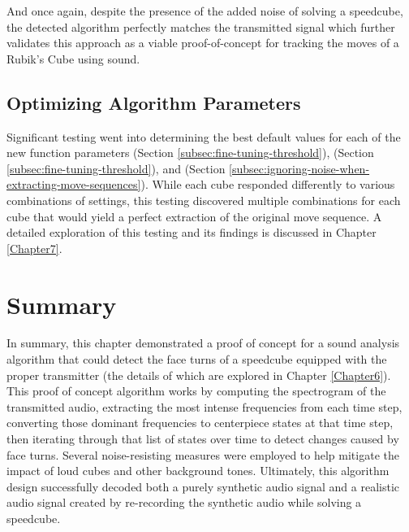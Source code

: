 And once again, despite the presence of the added noise of solving a speedcube, the detected algorithm perfectly matches the transmitted signal which further validates this approach as a viable proof-of-concept for tracking the moves of a Rubik's Cube using sound.

\subsection{Optimizing Algorithm Parameters}
\label{subsec:optimizing-params}
Significant testing went into determining the best default values for each of the new function parameters  (Section \ref{subsec:fine-tuning-threshold}),  (Section \ref{subsec:fine-tuning-threshold}), and  (Section \ref{subsec:ignoring-noise-when-extracting-move-sequences}).
While each cube responded differently to various combinations of settings, this testing discovered multiple combinations for each cube that would yield a perfect extraction of the original move sequence.
A detailed exploration of this testing and its findings is discussed in Chapter \ref{Chapter7}.

\section{Summary}
In summary, this chapter demonstrated a proof of concept for a sound analysis algorithm that could detect the face turns of a speedcube equipped with the proper transmitter (the details of which are explored in Chapter \ref{Chapter6}).
This proof of concept algorithm works by computing the spectrogram of the transmitted audio, extracting the most intense frequencies from each time step, converting those dominant frequencies to centerpiece states at that time step, then iterating through that list of states over time to detect changes caused by face turns.
Several noise-resisting measures were employed to help mitigate the impact of loud cubes and other background tones.
Ultimately, this algorithm design successfully decoded both a purely synthetic audio signal and a realistic audio signal created by re-recording the synthetic audio while solving a speedcube.
